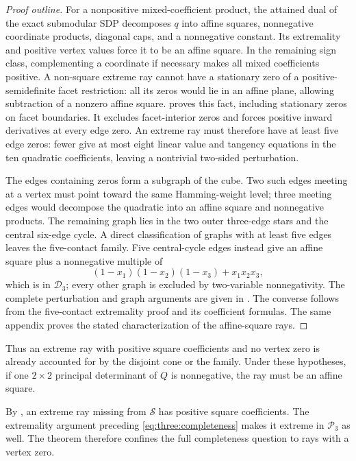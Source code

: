 \begin{proof}[Proof outline]
For a nonpositive mixed-coefficient product, the attained dual of the
exact submodular SDP decomposes $q$ into affine squares, nonnegative
coordinate products, diagonal caps, and a nonnegative constant. Its
extremality and positive vertex values force it to be an affine square.
In the remaining sign class, complementing a coordinate if necessary
makes all mixed coefficients positive. A non-square extreme ray cannot
have a stationary zero of a
positive-semidefinite facet restriction: all its zeros would lie in an
affine plane, allowing subtraction of a nonzero affine square.
 proves this fact, including stationary zeros
on facet boundaries. It excludes facet-interior zeros and forces positive
inward derivatives at every edge zero. An extreme ray must therefore have
at least five edge zeros: fewer give at most eight
linear value and tangency equations in the ten quadratic coefficients,
leaving a nontrivial two-sided perturbation.

The edges containing zeros form a subgraph of the cube. Two such edges
meeting at a vertex must point toward the same Hamming-weight level;
three meeting edges would decompose the quadratic into an affine square
and nonnegative products. The remaining graph lies in the two outer
three-edge stars and the central six-edge cycle. A direct classification
of graphs with at least five edges leaves the five-contact family. Five
central-cycle edges instead give an affine square plus a nonnegative
multiple of
\[
 (1-x_1)(1-x_2)(1-x_3)+x_1x_2x_3,
\]
which is in $\mathcal D_3$; every other graph is excluded by two-variable
nonnegativity. The complete perturbation and graph arguments are given in
. The converse follows from the
five-contact extremality proof and its coefficient formulas. The same
appendix proves the stated characterization of the affine-square rays.
\end{proof}

Thus an extreme ray with positive square coefficients and no vertex zero
is already accounted for by the disjoint cone or the family. Under these
hypotheses, if one $2\times2$ principal determinant of $Q$ is nonnegative,
the ray must be an affine square.

By , an extreme ray missing from $\mathcal S$ has
positive square coefficients. The extremality argument preceding
\eqref{eq:three:completeness} makes it extreme in $\mathcal P_3$ as well.
The theorem therefore confines the full completeness question to rays
with a vertex zero.
